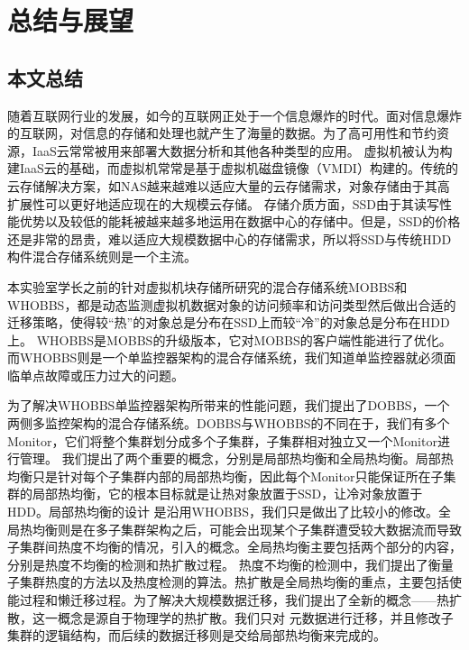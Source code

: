 
\chapter{总结与展望}
\label{chap:summary}
\section{本文总结}
随着互联网行业的发展，如今的互联网正处于一个信息爆炸的时代。面对信息爆炸的互联网，对信息的存储和处理也就产生了海量的数据。为了高可用性和节约资源，IaaS云常常被用来部署大数据分析和其他各种类型的应用。
虚拟机被认为构建IaaS云的基础，而虚拟机常常是基于虚拟机磁盘镜像（VMDI）构建的。传统的云存储解决方案，如NAS越来越难以适应大量的云存储需求，对象存储由于其高扩展性可以更好地适应现在的大规模云存储。
存储介质方面，SSD由于其读写性能优势以及较低的能耗被越来越多地运用在数据中心的存储中。但是，SSD的价格还是非常的昂贵，难以适应大规模数据中心的存储需求，所以将SSD与传统HDD构件混合存储系统则是一个主流。

本实验室学长之前的针对虚拟机块存储所研究的混合存储系统MOBBS和WHOBBS，都是动态监测虚拟机数据对象的访问频率和访问类型然后做出合适的迁移策略，使得较“热”的对象总是分布在SSD上而较“冷”的对象总是分布在HDD上。
WHOBBS是MOBBS的升级版本，它对MOBBS的客户端性能进行了优化。而WHOBBS则是一个单监控器架构的混合存储系统，我们知道单监控器就必须面临单点故障或压力过大的问题。

为了解决WHOBBS单监控器架构所带来的性能问题，我们提出了DOBBS，一个两侧多监控架构的混合存储系统。DOBBS与WHOBBS的不同在于，我们有多个Monitor，它们将整个集群划分成多个子集群，子集群相对独立又一个Monitor进行管理。
我们提出了两个重要的概念，分别是局部热均衡和全局热均衡。局部热均衡只是针对每个子集群内部的局部热均衡，因此每个Monitor只能保证所在子集群的局部热均衡，它的根本目标就是让热对象放置于SSD，让冷对象放置于HDD。局部热均衡的设计
是沿用WHOBBS，我们只是做出了比较小的修改。全局热均衡则是在多子集群架构之后，可能会出现某个子集群遭受较大数据流而导致子集群间热度不均衡的情况，引入的概念。全局热均衡主要包括两个部分的内容，分别是热度不均衡的检测和热扩散过程。
热度不均衡的检测中，我们提出了衡量子集群热度的方法以及热度检测的算法。热扩散是全局热均衡的重点，主要包括使能过程和懒迁移过程。为了解决大规模数据迁移，我们提出了全新的概念——热扩散，这一概念是源自于物理学的热扩散。我们只对
元数据进行迁移，并且修改子集群的逻辑结构，而后续的数据迁移则是交给局部热均衡来完成的。

